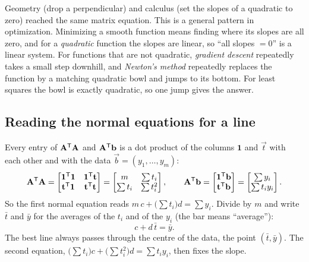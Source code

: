 \begin{connectionbox}
Geometry (drop a perpendicular) and calculus (set the slopes of a quadratic to zero) reached the
same matrix equation. This is a general pattern in optimization. Minimizing a smooth function means
finding where its slopes are all zero, and for a \emph{quadratic} function the slopes are linear,
so ``all slopes $=0$'' is a linear system. For functions that are not quadratic, \emph{gradient
descent} repeatedly takes a small step downhill, and \emph{Newton's method} repeatedly replaces the
function by a matching quadratic bowl and jumps to its bottom. For least squares the bowl is exactly
quadratic, so one jump gives the answer.
\end{connectionbox}

\subsection*{Reading the normal equations for a line}

Every entry of $\mathbf{A}^{\mathsf{T}}\mathbf{A}$ and $\mathbf{A}^{\mathsf{T}}\mathbf{b}$ is a dot product of the columns
$\mathbf{1}$ and $\vec{t}$ with each other and with the data $\vec{b}=(y_1,\dots,y_m)$:
\[
  \mathbf{A}^{\mathsf{T}}\mathbf{A}
  = \begin{bmatrix} \mathbf{1}^{\mathsf{T}}\mathbf{1} & \mathbf{1}^{\mathsf{T}}\mathbf{t}\\ \mathbf{t}^{\mathsf{T}}\mathbf{1} & \mathbf{t}^{\mathsf{T}}\mathbf{t}\end{bmatrix}
  = \begin{bmatrix} m & \sum t_i\\ \sum t_i & \sum t_i^2\end{bmatrix},
  \qquad
  \mathbf{A}^{\mathsf{T}}\mathbf{b}
  = \begin{bmatrix} \mathbf{1}^{\mathsf{T}}\mathbf{b}\\ \mathbf{t}^{\mathsf{T}}\mathbf{b}\end{bmatrix}
  = \begin{bmatrix} \sum y_i\\ \sum t_iy_i\end{bmatrix}.
\]
So the first normal equation reads $m\,c+\bigl(\sum t_i\bigr)d=\sum y_i$. Divide by $m$ and write
$\bar{t}$ and $\bar{y}$ for the averages of the $t_i$ and of the $y_i$ (the bar means ``average''):
\[
  c + d\,\bar{t} = \bar{y}.
\]
The best line always passes through the centre of the data, the point $(\bar{t},\bar{y})$. The second
equation, $\bigl(\sum t_i\bigr)c+\bigl(\sum t_i^2\bigr)d=\sum t_iy_i$, then fixes the slope.

